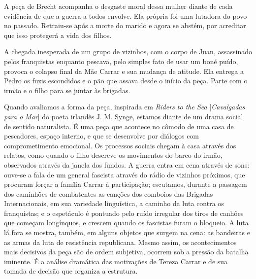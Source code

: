 A peça de Brecht acompanha o desgaste moral dessa mulher diante de cada
evidência de que a guerra a todos envolve. Ela própria foi uma lutadora
do povo no passado. Retraiu-se após a morte do marido e agora se abstém,
por acreditar que isso protegerá a vida dos filhos.

A chegada inesperada de um grupo de vizinhos, com o corpo de Juan,
assassinado pelos franquistas enquanto pescava, pelo simples fato de
usar um boné puído, provoca o colapso final da Mãe Carrar e sua mudança
de atitude. Ela entrega a Pedro os fuzis escondidos e o pão que assava
desde o início da peça. Parte com o irmão e o filho para se juntar às
brigadas.

Quando avaliamos a forma da peça, inspirada em {\it Riders to the Sea}
{[}{\it Cavalgadas para o Mar}{]} do poeta irlandês J. M. Synge, estamos
diante de um drama social de sentido naturalista. É uma peça que
acontece no cômodo de uma casa de pescadores, espaço interno, e que se
desenvolve por diálogos com comprometimento emocional. Os processos
sociais chegam à casa através dos relatos, como quando o filho descreve
os movimentos do barco do irmão, observados através da janela dos
fundos. A guerra entra em cena através de sons: ouve-se a fala de um
general fascista através do rádio de vizinhos próximos, que procuram
forçar a família Carrar à participação; escutamos, durante a passagem
dos caminhões de combatentes as canções dos comboios das Brigadas
Internacionais, em sua variedade linguística, a caminho da luta contra
os franquistas; e o espetáculo é pontuado pelo ruído irregular dos tiros
de canhões que começam longínquos, e crescem quando os fascistas furam o
bloqueio. A luta lá fora se mostra, também, em alguns objetos que surgem
na cena: as bandeiras e as armas da luta de resistência republicana.
Mesmo assim, os acontecimentos mais decisivos da peça são de ordem
subjetiva, ocorrem sob a pressão da batalha iminente. É a análise
dramática das motivações de Tereza Carrar e de sua tomada de decisão que
organiza a estrutura.

